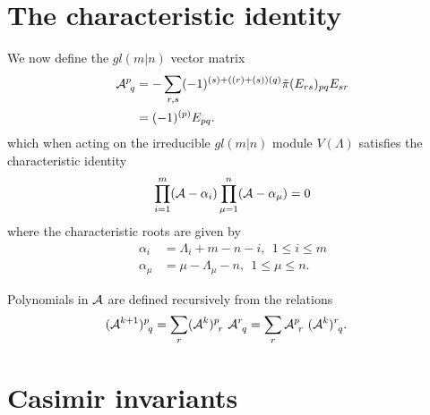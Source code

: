 \documentclass[12pt]{article}
\def\nn{\nonumber}
\begin{document}
\newpage
\section{The characteristic identity} 
\label{charident}

We now define the $gl(m|n)$ vector matrix \cite{GIW1}
\begin{align*}
	{\cal A}^{p}_{\ q} &= - \sum_{r,s} (-1)^{(s)+((r) + (s))(q)} \tilde{\pi}
(E_{rs})_{p q} E_{sr}\nn\\
	&= (-1)^{(p)}E_{p q}.\label{equdefx}
\end{align*}
which when acting on the irreducible
$gl(m|n)$ module $V(\Lambda)$ satisfies the characteristic identity
\begin{align*}
	\prod^m_{i=1} ({\cal A} - \alpha_i) \prod^n_{\mu=1} ({\cal A} - \alpha_\mu) = 0 
\end{align*}
where the characteristic roots are given by
\begin{align*}
\alpha_i &= \Lambda_i + m - n - i,\ \ 1\leq i\leq m \\
\alpha_\mu &= \mu-\Lambda_\mu - n,\ \ 1\leq \mu \leq n.
\end{align*}

Polynomials in ${\cal A}$ are defined recursively from the relations
\begin{align*}
({\cal A}^{k+1})^p_{\ q} &= \sum_r({\cal A}^k)^p_{\ r}\  {\cal A}^r_{\ q} = \sum_r
{\cal A}^p_{\ r}\ ({\cal A}^k)^r_{\ q} .\nn
\end{align*}




\section{Casimir invariants}
\label{Casimir}
\end{document}
